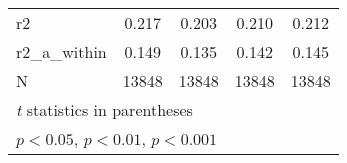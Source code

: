 {\begin{tabular}{l*{4}{c}}
\hline
r2          &       0.217         &       0.203         &       0.210         &       0.212         \\
r2\_a\_within &       0.149         &       0.135         &       0.142         &       0.145         \\
N           &       13848         &       13848         &       13848         &       13848         \\
\hline\hline
\multicolumn{5}{l}{\footnotesize \textit{t} statistics in parentheses}\\
\multicolumn{5}{l}{\footnotesize \sym{*} \(p<0.05\), \sym{**} \(p<0.01\), \sym{***} \(p<0.001\)}\\
\end{tabular}
}
